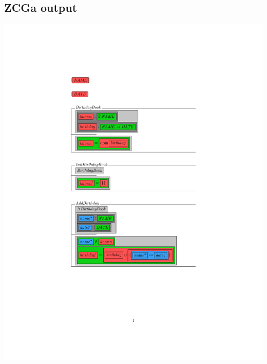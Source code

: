 \subsection{ZCGa output}
\label{app:bb1o}
\noindent \includegraphics[clip, trim=4cm 6cm 4cm 4.2cm]{examples/bb/1comp.pdf}

